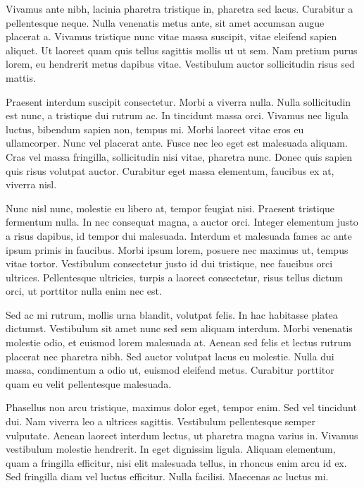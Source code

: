 Vivamus ante nibh, lacinia pharetra tristique in, pharetra sed lacus. Curabitur a pellentesque neque. Nulla venenatis metus ante, sit amet accumsan augue placerat a. Vivamus tristique nunc vitae massa suscipit, vitae eleifend sapien aliquet. Ut laoreet quam quis tellus sagittis mollis ut ut sem. Nam pretium purus lorem, eu hendrerit metus dapibus vitae. Vestibulum auctor sollicitudin risus sed mattis.

Praesent interdum suscipit consectetur. Morbi a viverra nulla. Nulla sollicitudin est nunc, a tristique dui rutrum ac. In tincidunt massa orci. Vivamus nec ligula luctus, bibendum sapien non, tempus mi. Morbi laoreet vitae eros eu ullamcorper. Nunc vel placerat ante. Fusce nec leo eget est malesuada aliquam. Cras vel massa fringilla, sollicitudin nisi vitae, pharetra nunc. Donec quis sapien quis risus volutpat auctor. Curabitur eget massa elementum, faucibus ex at, viverra nisl.

Nunc nisl nunc, molestie eu libero at, tempor feugiat nisi. Praesent tristique fermentum nulla. In nec consequat magna, a auctor orci. Integer elementum justo a risus dapibus, id tempor dui malesuada. Interdum et malesuada fames ac ante ipsum primis in faucibus. Morbi ipsum lorem, posuere nec maximus ut, tempus vitae tortor. Vestibulum consectetur justo id dui tristique, nec faucibus orci ultrices. Pellentesque ultricies, turpis a laoreet consectetur, risus tellus dictum orci, ut porttitor nulla enim nec est.

Sed ac mi rutrum, mollis urna blandit, volutpat felis. In hac habitasse platea dictumst. Vestibulum sit amet nunc sed sem aliquam interdum. Morbi venenatis molestie odio, et euismod lorem malesuada at. Aenean sed felis et lectus rutrum placerat nec pharetra nibh. Sed auctor volutpat lacus eu molestie. Nulla dui massa, condimentum a odio ut, euismod eleifend metus. Curabitur porttitor quam eu velit pellentesque malesuada.

Phasellus non arcu tristique, maximus dolor eget, tempor enim. Sed vel tincidunt dui. Nam viverra leo a ultrices sagittis. Vestibulum pellentesque semper vulputate. Aenean laoreet interdum lectus, ut pharetra magna varius in. Vivamus vestibulum molestie hendrerit. In eget dignissim ligula. Aliquam elementum, quam a fringilla efficitur, nisi elit malesuada tellus, in rhoncus enim arcu id ex. Sed fringilla diam vel luctus efficitur. Nulla facilisi. Maecenas ac luctus mi.